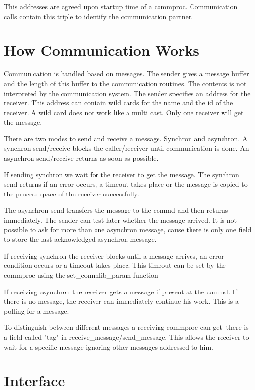 This addresses are agreed upon startup time of a commproc.
Communication calls contain this triple to identify the communication
partner.


\section{How Communication Works}

Communication is handled based on messages. The sender gives a message buffer
and the length of this buffer to the communication routines. The contents 
is not interpreted by the communication system. The sender specifies an
address for the receiver. This address can contain wild cards for the name
and the id of the receiver. A wild card does not work like a multi cast. Only
one receiver will get the message.

There are two modes to send and receive a message. Synchron and asynchron.
A synchron send/receive blocks the caller/receiver until communication is
done. An asynchron send/receive returns as soon as possible.

If sending synchron we wait for the receiver to get the message. The synchron
send returns if an error occurs, a timeout takes place or the message is
copied to the process space of the receiver successfully.

The asynchron send transfers the message to the commd and then returns 
immediately. The sender can test later whether the message arrived.
It is not possible to ask for more than one asynchron message, cause there
is only one field to store the last acknowledged asynchron message.

If receiving synchron the receiver blocks until a message arrives, an
error condition occurs or a timeout takes place.   This timeout can be
set by the commproc using the set\_commlib\_param function.

If receiving asynchron the receiver gets a message if present at the commd.
If there is no message, the receiver can immediately continue his work.
This is a polling for a message.

To distinguish between different messages a receiving commproc can get,
there is a field called "tag" in receive\_message/send\_message. This
allows the receiver to wait for a specific message ignoring other
messages addressed to him.


\section{Interface}


